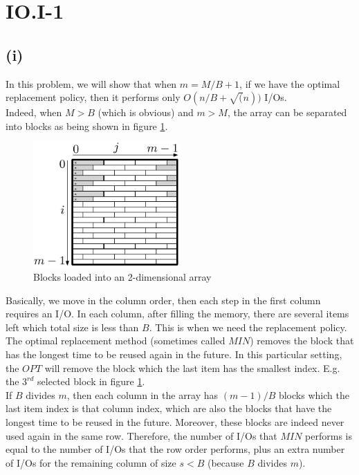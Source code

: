 \section*{IO.I-1}
\subsection*{(i)}
In this problem, we will show that when $m = M/B + 1$, if we have the optimal replacement policy, then it performs only $O(n/B + \sqrt(n))$ I/Os.\\

Indeed, when $M > B$ (which is obvious) and $m > M$, the array can be separated into blocks as being shown in figure \ref{fig:row-major}. \\

\begin{figure}
  \centering
  \includegraphics[width=0.5\textwidth]{row-major}
  \caption{Blocks loaded into an 2-dimensional array}
  \label{fig:row-major}
\end{figure}

Basically, we move in the column order, then each step in the first column requires an I/O. In each column, after filling the memory, there are several items left which total size is less than $B$. This is when we need the replacement policy. The optimal replacement method (sometimes called $MIN$) removes the block that has the longest time to be reused again in the future. In this particular setting, the $OPT$ will remove the block which the last item has the smallest index. E.g. the $3^{rd}$ selected block in figure \ref{fig:row-major}.\\

If $B$ divides $m$, then each column in the array has $(m - 1) / B$ blocks which the last item index is that column index, which are also the blocks that have the longest time to be reused in the future. Moreover, these blocks are indeed never used again in the same row. Therefore, the number of I/Os that $MIN$ performs is equal to the number of I/Os that the row order performs, plus an extra number of I/Os for the remaining column of size $s < B$ (because $B$ divides $m$).\\

